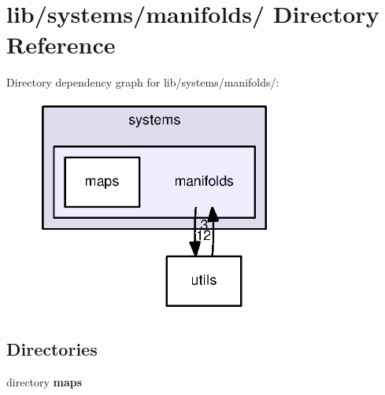 \section{lib/systems/manifolds/ \-Directory \-Reference}
\label{dir_e0b4743ced4f18fd8aa0b7854862c8ed}
\-Directory dependency graph for lib/systems/manifolds/\-:\nopagebreak
\begin{figure}[H]
\begin{center}
\leavevmode
\includegraphics[width=222pt]{dir_e0b4743ced4f18fd8aa0b7854862c8ed_dep}
\end{center}
\end{figure}
\subsection*{\-Directories}
\begin{DoxyCompactItemize}
\item 
directory {\bf maps}
\end{DoxyCompactItemize}
